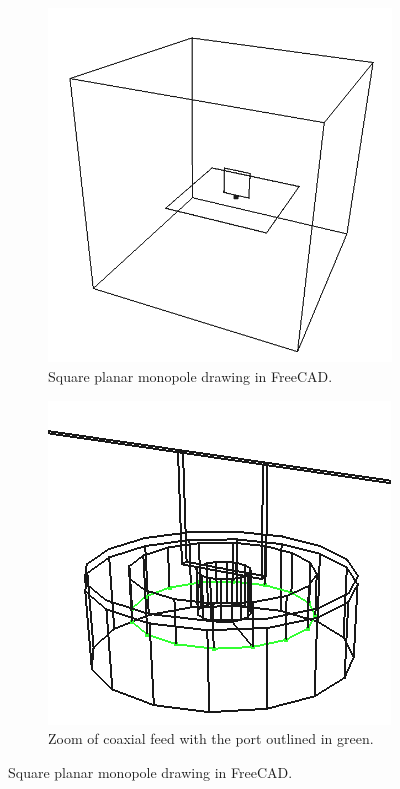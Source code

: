 \documentclass[titlepage]{article}
\renewcommand\_{\textunderscore\linebreak[1]}
\begin{document}
\begin{figure}[H]
  \centering
  \begin{subfigure}[t]{0.38\textwidth}
     \includegraphics[width=0.95\linewidth]{../regression/OpenParEM3D/antenna/square_monopole_study/screenshots/drawing}
     \caption{Square planar monopole drawing in FreeCAD.}
  \end{subfigure}
  \begin{subfigure}[t]{0.38\textwidth}
     \includegraphics[width=0.95\linewidth]{../regression/OpenParEM3D/antenna/square_monopole_study/screenshots/drawing_zoom}
     \caption{Zoom of coaxial feed with the port outlined in green.}
  \end{subfigure}
  \caption{Square planar monopole drawing in FreeCAD.}
  \label{fig:square_planar_drawing}
\end{figure}
\end{document}
